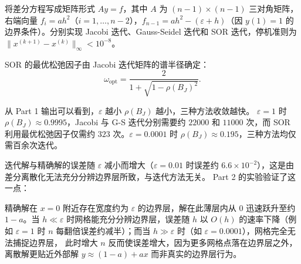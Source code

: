 \documentclass{article}
\begin{document}
\begin{solution}
  将差分方程写成矩阵形式 $Ay = f$，其中 $A$ 为 $(n-1)\times(n-1)$ 三对角矩阵，右端向量
  $f_i = ah^2$（$i = 1,\dots,n-2$），$f_{n-1} = ah^2 - (\varepsilon +
  h)$（因 $y(1) = 1$
  的边界条件）。分别实现 Jacobi 迭代、Gauss-Seidel 迭代和 SOR 迭代，停机准则为
  $\|x^{(k+1)} - x^{(k)}\|_\infty < 10^{-8}$。

  SOR 的最优松弛因子由 Jacobi 迭代矩阵的谱半径确定：
  \[
    \omega_{\mathrm{opt}} = \frac{2}{1 + \sqrt{1 - \rho(B_J)^2}}.
  \]

  
  

  从 Part 1 输出可以看到，$\varepsilon$ 越小 $\rho(B_J)$ 越小，三种方法收敛越快。
  $\varepsilon = 1$ 时 $\rho(B_J) \approx 0.9995$，Jacobi 与 G-S 迭代分别需要约 $22000$
  和 $11000$ 次，而 SOR 利用最优松弛因子仅需约 $323$ 次。$\varepsilon = 0.0001$ 时
  $\rho(B_J) \approx 0.195$，三种方法均仅需百余次迭代。

  迭代解与精确解的误差随 $\varepsilon$ 减小而增大（$\varepsilon = 0.01$ 时误差约
  $6.6 \times 10^{-2}$），这是由差分离散化无法充分分辨边界层所致，与迭代方法无关。
  Part 2 的实验验证了这一点：

  精确解在 $x = 0$ 附近存在宽度约为 $\varepsilon$ 的边界层，解在此薄层内从 $0$
  迅速跃升至约 $1 - a$。当 $h \ll \varepsilon$ 时网格能充分分辨边界层，误差随 $h$ 以
  $O(h)$ 的速率下降（例如 $\varepsilon = 1$ 时 $n$ 每翻倍误差约减半）；而当
  $h \gg \varepsilon$ 时（如 $\varepsilon = 0.0001$），网格完全无法捕捉边界层，
  此时增大 $n$ 反而使误差增大，因为更多网格点落在边界层之外，离散解更贴近外部解
  $y \approx (1-a) + ax$ 而非真实的边界层行为。
\end{solution}
\end{document}
